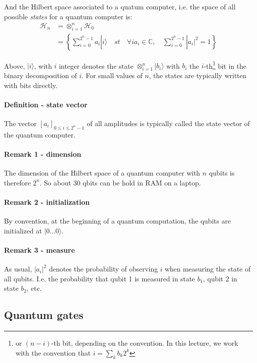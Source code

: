 \documentclass{article}
\begin{document}
And the Hilbert space associated to a quatum computer, i.e. the space of all possible \emph{states} for a quantum computer is: 
\begin{align*}
\mathcal{H}_n &=  \otimes_{i=1}^{n} \mathcal{H}_0 \\
              &=  \left\{\sum_{i=0}^{2^n - 1} a_i |i\rangle\quad st\quad\forall i a_i \in \mathbb{C},\quad\sum_{i=0}^{2^n - 1} |a_i|^2 = 1 \right\} 
\end{align*}

Above, $|i\rangle$, with $i$ integer denotes the state $\otimes_{i=1}^{n} |b_i\rangle $ with $b_i$ the $i$-th\footnote{or $(n-i)$-th bit, depending on the
convention. In this lecture, we work with the convention that $i = \sum_{k} b_k 2^k$} bit in the binary decomposition of $i$. For small values of $n$, the states are typically written with bits directly.

\paragraph{Definition - state vector} The vector $[a_i]_{0\leq i \leq 2^n-1}$ of all amplitudes 
is typically called the state vector of the quantum computer.

\paragraph{Remark 1 - dimension} The dimension of the Hilbert space of a quantum computer with $n$ qubits is therefore $2^n$.
So about $30$ qbits can be hold in RAM on a laptop.

\paragraph{Remark 2 - initialization} By convention, at the beginning of a quantum computation, the qubits are initialized at $|0\dots 0\rangle$.

\paragraph{Remark 3 - measure} As usual, $|a_i|^2$ denotes the probability of observing $i$ when measuring the state of all qubits.
I.e. the probability that qubit 1 is measured in state $b_1$, qubit 2 in state $b_2$, etc.

\subsection{Quantum gates} 
\end{document}
